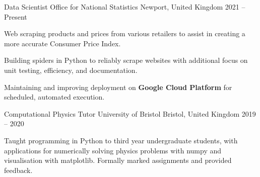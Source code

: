 
\begin{cventries}

    \cventry
        {Data Scientist} %
        {Office for National Statistics} %
        {Newport, United Kingdom} %
        {2021 -- Present} %
        {
            \begin{cvitems} %
                \item{Web scraping products and prices from various retailers to assist in creating a more accurate Consumer Price Index.}
                \item{Building spiders in Python to reliably scrape websites with additional focus on unit testing, efficiency, and documentation.}
                \item{Maintaining and improving deployment on \textbf{Google Cloud Platform} for scheduled, automated execution.}
            \end{cvitems}
        }

    \cventry
        {Computational Physics Tutor} %
        {University of Bristol} %
        {Bristol, United Kingdom} %
        {2019 -- 2020} %
        {
            \begin{cvitems} %
                \item{Taught programming in Python to third year undergraduate students, with applications for numerically solving physics problems with numpy and visualisation with matplotlib. Formally marked assignments and provided feedback.}
            \end{cvitems}
        }


\end{cventries}
